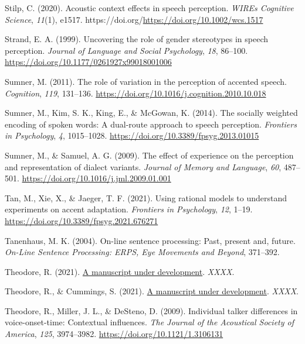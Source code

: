 \documentclass[
  11pt,
  man,floatsintext]{apa6}
\newlength{\cslhangindent}
\newlength{\cslentryspacingunit} %
\newenvironment{CSLReferences}[2] %
 {%
  \setlength{\parindent}{0pt}
  \ifodd #1
  \let\oldpar\par
  \def\par{\hangindent=\cslhangindent\oldpar}
  \fi
  \setlength{\parskip}{#2\cslentryspacingunit}
 }%
 {}
\begin{document}
\begin{CSLReferences}{1}{0}
\leavevmode{}%
Stilp, C. (2020). Acoustic context effects in speech perception. \emph{WIREs Cognitive Science}, \emph{11}(1), e1517. https://doi.org/\url{https://doi.org/10.1002/wcs.1517}

\leavevmode{}%
Strand, E. A. (1999). Uncovering the role of gender stereotypes in speech perception. \emph{Journal of Language and Social Psychology}, \emph{18}, 86--100. \url{https://doi.org/10.1177/0261927x99018001006}

\leavevmode{}%
Sumner, M. (2011). The role of variation in the perception of accented speech. \emph{Cognition}, \emph{119}, 131--136. \url{https://doi.org/10.1016/j.cognition.2010.10.018}

\leavevmode{}%
Sumner, M., Kim, S. K., King, E., \& McGowan, K. (2014). The socially weighted encoding of spoken words: A dual-route approach to speech perception. \emph{Frontiers in Psychology}, \emph{4}, 1015--1028. \url{https://doi.org/10.3389/fpsyg.2013.01015}

\leavevmode{}%
Sumner, M., \& Samuel, A. G. (2009). The effect of experience on the perception and representation of dialect variants. \emph{Journal of Memory and Language}, \emph{60}, 487--501. \url{https://doi.org/10.1016/j.jml.2009.01.001}

\leavevmode{}%
Tan, M., Xie, X., \& Jaeger, T. F. (2021). Using rational models to understand experiments on accent adaptation. \emph{Frontiers in Psychology}, \emph{12}, 1--19. \url{https://doi.org/10.3389/fpsyg.2021.676271}

\leavevmode{}%
Tanenhaus, M. K. (2004). On-line sentence processing: Past, present and, future. \emph{On-Line Sentence Processing: ERPS, Eye Movements and Beyond}, 371--392.

\leavevmode{}%
Theodore, R. (2021). \href{}{A manuscript under development}. \emph{XXXX}.

\leavevmode{}%
Theodore, R., \& Cummings, S. (2021). \href{}{A manuscript under development}. \emph{XXXX}.

\leavevmode{}%
Theodore, R., Miller, J. L., \& DeSteno, D. (2009). Individual talker differences in voice-onset-time: Contextual influences. \emph{The Journal of the Acoustical Society of America}, \emph{125}, 3974--3982. \url{https://doi.org/10.1121/1.3106131}


\end{CSLReferences}
\end{document}
